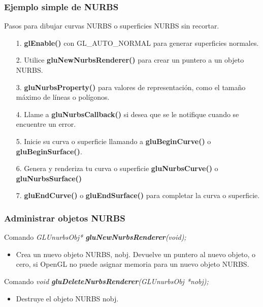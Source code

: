 \documentclass[10.5pt]{beamer}
\begin{document}

\begin{frame}[fragile]
\frametitle{Ejemplo simple de NURBS}
\small
Pasos para dibujar curvas NURBS o superficies NURBS sin recortar.
\begin{itemize}
    \item[1.] \textbf{glEnable()} con GL\_AUTO\_NORMAL para generar superficies normales.
    \item[2.] Utilice \textbf{gluNewNurbsRenderer()} para crear un puntero
    a un objeto NURBS.
    \item[3.] \textbf{gluNurbsProperty()} para valores de representación,
    como el tamaño máximo de líneas o polígonos.
    \item[4.] Llame a \textbf{gluNurbsCallback()} si desea que se le notifique
    cuando se encuentre un error.
    \item[5.] Inicie su curva o superficie llamando a \textbf{gluBeginCurve()}
    o \textbf{gluBeginSurface()}.
    \item[6.] Genera y renderiza tu curva o superficie \textbf{gluNurbsCurve()} o \textbf{gluNurbsSurface()}
    \item[7.] \textbf{gluEndCurve()} o \textbf{gluEndSurface()}
    para completar la curva o superficie.
\end{itemize}
\end{frame}


\begin{frame}[fragile]
\frametitle{Administrar objetos NURBS}
\small

\begin{alertblock}{Comando}
    \small
    \emph{GLUnurbsObj* \textbf{gluNewNurbsRenderer}(void);}
\end{alertblock}

\begin{itemize}
    \justifying
    \item Crea un nuevo objeto NURBS, nobj.
    Devuelve un puntero al nuevo objeto, o cero, si OpenGL no
    puede asignar memoria para un nuevo objeto NURBS.
\end{itemize}

\begin{alertblock}{Comando}
    \small
    \emph{void \textbf{gluDeleteNurbsRenderer}(GLUnurbsObj *nobj);}
\end{alertblock}

\begin{itemize}
    \justifying
    \item Destruye el objeto NURBS nobj.
\end{itemize}

\end{frame}
\end{document}
